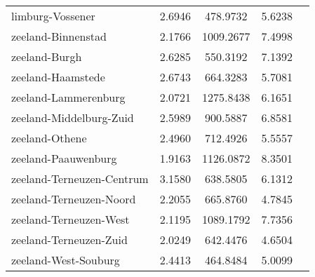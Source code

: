 \begin{longtable}{llccc}
limburg-Vossener & 2.6946 & 478.9732 & 5.6238 \\
zeeland-Binnenstad & 2.1766 & 1009.2677 & 7.4998 \\
zeeland-Burgh & 2.6285 & 550.3192 & 7.1392 \\
zeeland-Haamstede & 2.6743 & 664.3283 & 5.7081 \\
zeeland-Lammerenburg & 2.0721 & 1275.8438 & 6.1651 \\
zeeland-Middelburg-Zuid & 2.5989 & 900.5887 & 6.8581 \\
zeeland-Othene & 2.4960 & 712.4926 & 5.5557 \\
zeeland-Paauwenburg & 1.9163 & 1126.0872 & 8.3501 \\
zeeland-Terneuzen-Centrum & 3.1580 & 638.5805 & 6.1312 \\
zeeland-Terneuzen-Noord & 2.2055 & 665.8760 & 4.7845 \\
zeeland-Terneuzen-West & 2.1195 & 1089.1792 & 7.7356 \\
zeeland-Terneuzen-Zuid & 2.0249 & 642.4476 & 4.6504 \\
zeeland-West-Souburg & 2.4413 & 464.8484 & 5.0099 \\
\hline
\end{longtable}
